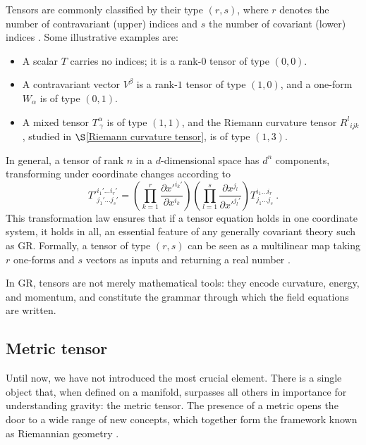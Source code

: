 Tensors are commonly classified by their type $(r,s)$, where $r$ denotes the number of contravariant (upper) indices and $s$ the number of covariant (lower) indices \cite{Llibre_Peter_Collier_unacosadificildecomprender}. 
Some illustrative examples are:

\begin{itemize}
    \item A scalar $T$ carries no indices; it is a rank-$0$ tensor of type $(0,0)$.
    \item A contravariant vector $V^{\beta}$ is a rank-$1$ tensor of type $(1,0)$, and a one-form $W_\alpha$ is of type $(0,1)$.
    \item A mixed tensor $T^\alpha_{\ \gamma}$ is of type $(1,1)$, and the Riemann curvature tensor $R^l{}_{ijk}$, studied in 
    $\S$\ref{Riemann curvature tensor}, is of type $(1,3)$.
\end{itemize}

In general, a tensor of rank $n$ in a $d$-dimensional space has $d^n$ components, transforming under coordinate changes according to
\begin{equation}
T'^{i_1' \dots i_r'}_{j_1' \dots j_s'} = 
\left( \prod_{k=1}^r \frac{\partial x'^{i_k'}}{\partial x^{i_k}} \right)
\left( \prod_{l=1}^s \frac{\partial x^{j_l}}{\partial x'^{j_l'}} \right)
T^{i_1 \dots i_r}_{j_1 \dots j_s} \ .
\end{equation}
This transformation law ensures that if a tensor equation holds in one coordinate system, it holds in all, an essential feature of any generally covariant theory such as GR. Formally, a tensor of type $(r,s)$ can be seen as a multilinear map taking $r$ one-forms and $s$ vectors as inputs and returning a real number \cite{Theory_of_Gravitational_Waves_arxiv}.

In GR, tensors are not merely mathematical tools: they encode curvature, energy, and momentum, and constitute the grammar through which the field equations are written.

\subsection{Metric tensor}
\label{metric tensor}

Until now, we have not introduced the most crucial element. There is a single object that, when defined on a manifold, surpasses all others in importance for understanding gravity: the metric tensor. The presence of a metric opens the door to a wide range of new concepts, which together form the framework known as Riemannian geometry \cite{llibretongGR}.

